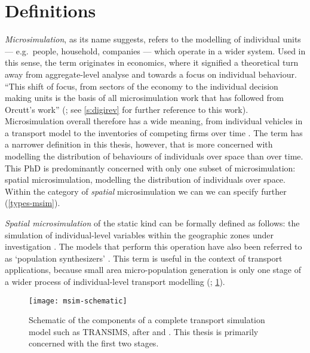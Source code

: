 \section{Definitions}
\label{s:defs}
\emph{Microsimulation}, as its name suggests, refers to the modelling of
individual units --- e.g.~people, household, companies --- which operate in a
wider system. Used in this sense, the term originates in economics, where it
signified a theoretical turn away from aggregate-level analyse and towards a
focus on individual behaviour. ``This shift of focus, from sectors of the
economy to the individual decision making units is the basis of all
microsimulation work that has followed from Orcutt's work''
(\citealp[p.~145]{Holm1987}; see \cref{s:digirev} for further reference to
this work). Microsimulation overall therefore has a wide meaning, from
individual vehicles in a transport model \citep{Liu2006, Ferguson2012}
to the inventories of
competing firms over time \citep{Bergmann1990a}.
The term has a narrower definition in this
thesis, however, that is more concerned with modelling the distribution of
behaviours of individuals over space than over time. This PhD is predominantly
concerned with only one subset of microsimulation: spatial
microsimulation, modelling the distribution of individuals over
space. Within the category of \emph{spatial} microsimulation we can
we can specify further (\cref{types-msim}).

\emph{Spatial microsimulation} of the static kind can be formally
defined as
follows: the simulation of individual-level variables within the geographic
zones under investigation \citep{ballas2003microsimulation-30-years, Ballas2007simb}.
The models that perform this operation have also
been referred to as `population synthesizers' \citep{Mohammadian2010}. This
term is useful in the context of transport applications, because small area
micro-population generation is only one stage of a wider process of
individual-level transport modelling (\citealp{Pritchard2012}; \cref{f:msim-schematic}).

\begin{figure}[h]
 \centering
 \texttt{[image: msim-schematic]}
 \caption[Schematic a transport simulation model]{Schematic
of the components of a complete transport simulation model such as
TRANSIMS, after \citet{nagel1999transims} and \citet{Mohammadian2010}.
This thesis is primarily concerned with the first two stages.}
 \label{f:msim-schematic}
\end{figure}

